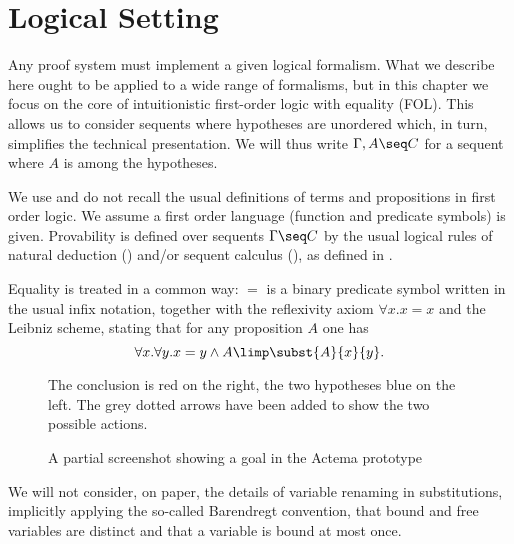 

\section{Logical Setting}
Any proof system must implement a given logical formalism. What we
describe here ought to be applied to a wide range of formalisms, but
in this chapter we focus on the core of intuitionistic first-order logic
with equality (FOL). This allows us to consider sequents where
hypotheses are unordered which, in turn, simplifies the technical
presentation.  We will thus write $\Gamma,A \seq C$ for a sequent
where $A$ is among the hypotheses.

We use and do not recall the usual definitions of terms and propositions in
first order logic. We assume a first order language (function and predicate
symbols) is given. Provability is defined over sequents $\Gamma\seq C$ by the
usual logical rules of natural deduction () and/or sequent calculus
(), as defined in .

Equality is treated in a common way: $=$ is a binary
predicate symbol written in the usual infix notation, together with the
reflexivity axiom $\forall x.x=x$ and the Leibniz scheme, stating that for any
proposition $A$ one has
$$\forall x.\forall y. x=y\land A \limp \subst{A}{x}{y}.$$

\begin{figure*}
 \begin{center}
 \end{center}
 \caption{A partial screenshot showing a goal in the Actema prototype}
 The conclusion is red on the right, the two hypotheses blue on the left. The
   grey dotted arrows have been added to show the two possible actions.
 \end{figure*}

We will not consider, on paper, the details of variable renaming in
substitutions, implicitly applying the so-called Barendregt
convention, that bound and free variables are distinct and that a
variable is bound at most once.

